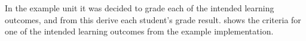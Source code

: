 







In the example unit it was decided to grade each of the intended learning outcomes, and from this derive each student's grade result.  shows the criteria for one of the intended learning outcomes from the example implementation. 


